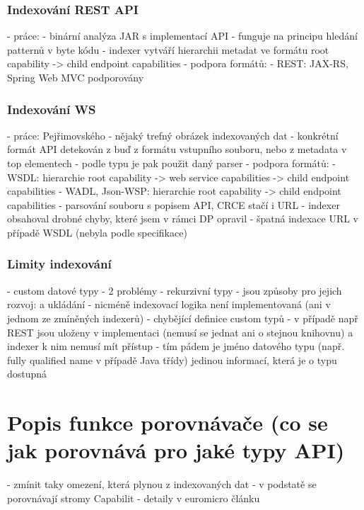 \documentclass[czech,DP]{thesiskiv}
\begin{document}
\subsection{Indexování REST API}

- práce: \cite{hessova2015rest}
- binární analýza JAR s implementací API
- funguje na principu hledání patternů v byte kódu
- indexer vytváří hierarchii metadat ve formátu root capability -> child endpoint capabilities
- podpora formátů:
	- REST: JAX-RS, Spring Web MVC podporovány

\subsection{Indexování WS}

- práce: Pejřimovského \cite{pejrimovsky2015ws}
- nějaký trefný obrázek indexovaných dat
- konkrétní formát API detekován z buď z formátu vstupního souboru, nebo z metadata v top elementech
- podle typu je pak použit daný parser
- podpora formátů:
	- WSDL: hierarchie root capability -> web service capabilities -> child endpoint capabilities
	- WADL, Json-WSP: hierarchie root capability -> child endpoint capabilities
	- parsování souboru s popisem API, CRCE stačí i URL
- indexer obsahoval drobné chyby, které jsem v rámci DP opravil
	- špatná indexace URL v případě WSDL (nebyla podle specifikace)

\subsection{Limity indexování}

 - custom datové typy
 - 2 problémy
	- rekurzivní typy
		- jsou způsoby pro jejich rozvoj: \cite{abadi1995subytping} a ukládání
		- nicméně indexovací logika není implementovaná (ani v jednom ze zmíněných indexerů)
	- chybějící definice custom typů
		- v případě např REST jsou uloženy v implementaci (nemusí se jednat ani o stejnou knihovnu) a indexer k nim nemusí mít přístup
		- tím pádem je jméno datového typu (např. fully qualified name v případě Java třídy) jedinou informací, která je o typu dostupná

\chapter{Popis funkce porovnávače (co se jak porovnává pro jaké typy API)}

- zmínit taky omezení, která plynou z indexovaných dat
- v podstatě se porovnávají stromy Capabilit
- detaily v euromicro článku
\end{document}
